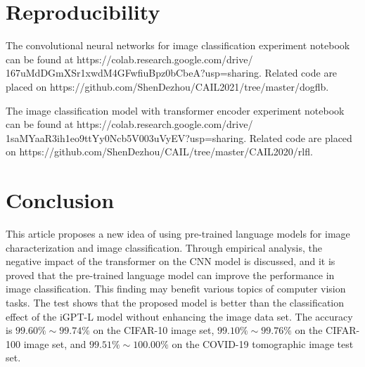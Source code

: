\documentclass[runningheads]{llncs}
\begin{document}
\section{Reproducibility}

The convolutional neural networks for image classification experiment notebook can be found at https://colab.research.google.com/drive/\\
167uMdDGmXSr1xwdM4GFwfiuBpz0bCbeA?usp=sharing. Related code are placed on https://github.com/ShenDezhou/CAIL2021/tree/master/dogflb.

The image classification model with transformer encoder experiment notebook can be found at https://colab.research.google.com/drive/\\
1saMYaaR3ih1eo9ttYy0Ncb5V003uVyEV?usp=sharing. Related code are placed on https://github.com/ShenDezhou/CAIL/tree/master/CAIL2020/rlfl.



\section{Conclusion}

This article proposes a new idea of using pre-trained language models for image characterization and image classification.
Through empirical analysis, the negative impact of the transformer on the CNN model is discussed, and it is proved that the pre-trained language model can improve the performance in image classification.
This finding may benefit various topics of computer vision tasks.
The test shows that the proposed model is better than the classification effect of the iGPT-L model without enhancing the image data set.
The accuracy is $99.60\%\sim99.74\%$ on the CIFAR-10 image set, $99.10\%\sim99.76\%$ on the CIFAR-100 image set, and $99.51\%\sim100.00\%$ on the COVID-19 tomographic image test set.

%
%
%
% 
% 
%
{\small



}
\end{document}
